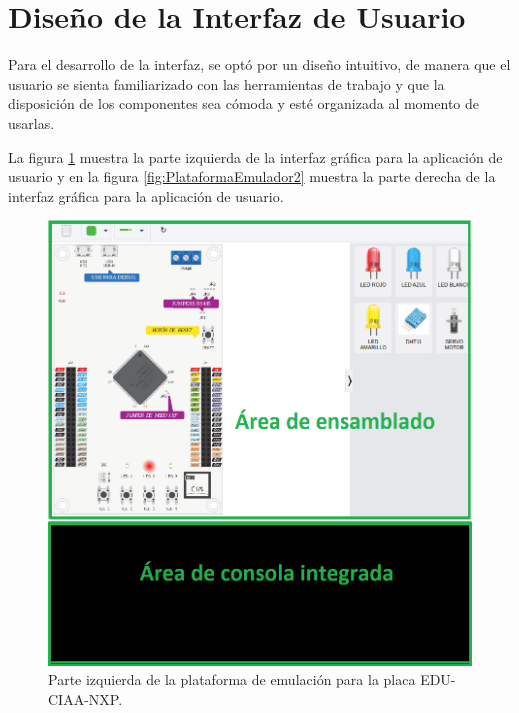 \section{Diseño de la Interfaz de Usuario}

Para el desarrollo de la interfaz, se optó por un diseño intuitivo, de manera que el usuario se sienta familiarizado con las herramientas de trabajo y que la disposición de los componentes sea cómoda y esté organizada al momento de usarlas.

La figura \ref{fig:PlataformaEmulador1} muestra la parte izquierda de la interfaz gráfica para la aplicación de usuario 
y en la figura \ref{fig:PlataformaEmulador2} muestra la parte derecha de la interfaz gráfica para la aplicación de usuario.

\hfill \break
\hfill \break
\hfill \break
\hfill \break
\hfill \break
\hfill \break

\begin{figure}[ht]
	\centering
	\includegraphics[scale=.60]{./Figures/PlataformaEmulador1.png}
	\caption{Parte izquierda de la plataforma de emulación para la placa EDU-CIAA-NXP.}
	\label{fig:PlataformaEmulador1}
\end{figure}

\hfill \break
\hfill \break
\hfill \break
\hfill \break
\hfill \break
\hfill \break
\hfill \break
\hfill \break
\hfill \break
\hfill \break
\hfill \break
\hfill \break
\hfill \break
\hfill \break
\hfill \break

